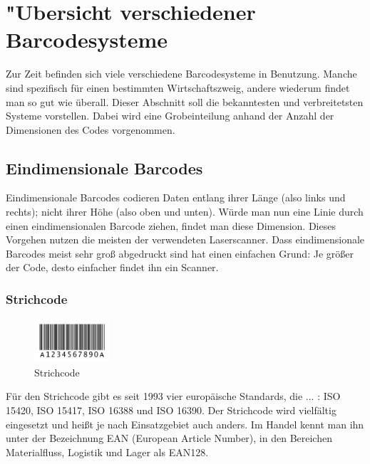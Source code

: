 \section{"Ubersicht verschiedener Barcodesysteme}
Zur Zeit befinden sich viele verschiedene Barcodesysteme in Benutzung. Manche sind spezifisch für einen bestimmten Wirtschaftszweig, andere wiederum findet man so gut wie überall. Dieser Abschnitt soll die bekanntesten und verbreitetsten Systeme vorstellen. Dabei wird eine Grobeinteilung anhand der Anzahl der Dimensionen des Codes vorgenommen.

\subsection{Eindimensionale Barcodes}
Eindimensionale Barcodes codieren Daten entlang ihrer Länge (also links und rechts); nicht ihrer Höhe (also oben und unten). Würde man nun eine Linie durch einen eindimensionalen Barcode ziehen, findet man diese Dimension. Dieses Vorgehen nutzen die meisten der verwendeten Laserscanner. Dass eindimensionale Barcodes meist sehr groß abgedruckt sind hat einen einfachen Grund: Je größer der Code, desto einfacher findet ihn ein Scanner.

\subsubsection{Strichcode}
\begin{figure}
	\centering
	\vspace{-0.2cm}
\includegraphics[width=0.25\textwidth]{Bilder/Barcode.png}
	\vspace{-0.2cm}
	\caption[]{Strichcode\footnotemark}
	\label{barcode}
\end{figure}
Für den Strichcode gibt es seit 1993 vier europäische Standards, die ... : ISO 15420, ISO 15417, ISO 16388 und ISO 16390.
Der Strichcode wird vielfältig eingesetzt und heißt je nach Einsatzgebiet auch anders. Im Handel kennt man ihn unter der Bezeichnung EAN (European Article Number), in den Bereichen Materialfluss, Logistik und Lager als EAN128.

